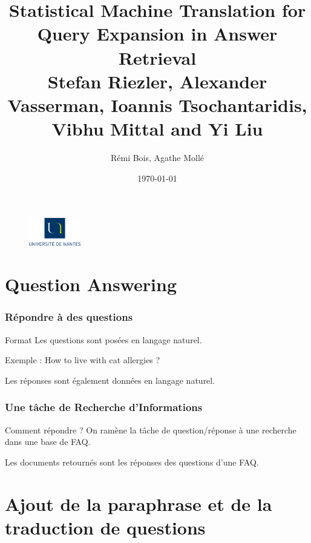 \documentclass[10pt]{beamer}
\title{Statistical Machine Translation for Query Expansion in Answer
  Retrieval\cite{Riezler07}\\ 
\small
Stefan Riezler, Alexander Vasserman, Ioannis Tsochantaridis, Vibhu
Mittal and Yi Liu}
\author{Rémi Bois, Agathe Mollé}
\date{\today}
\begin{document}
\begin{frame}
  \maketitle
  \vfill
  \begin{figure}
    \includegraphics[width=0.20\textwidth]{logo_univ_nantes}
  \end{figure}

\end{frame}

\begin{frame}
  \tableofcontents
\end{frame}

\section{Question Answering}
\label{sec:QA}

\begin{frame}
  \frametitle{Répondre à des questions}
  \begin{block}{Format}
    Les questions sont posées en langage naturel.

    Exemple : How to live with cat allergies ?

    Les réponses sont également données en langage naturel.
  \end{block}
\end{frame}

\begin{frame}
  \frametitle{Une tâche de Recherche d'Informations}

  \begin{block}{Comment répondre ?}
    On ramène la tâche de question/réponse à une recherche dans une
    base de FAQ. 

    Les documents retournés sont les réponses des
    questions d'une FAQ.
  \end{block}
\end{frame}

\section{Ajout de la paraphrase et de la traduction de questions}
\label{sec:paratrans}
\end{document}

